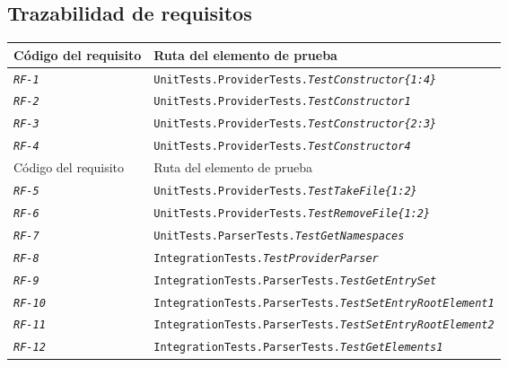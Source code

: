     \subsection{Trazabilidad de requisitos} \label{subsec:trazabilidad}
        \begin{longtable}{|| M{3cm} | M{12cm} ||} 
                \hline
                    Código del requisito & Ruta del elemento de prueba \\
                \hline\hline
                    \texttt{\textit{RF-1}} & \texttt{UnitTests.ProviderTests.\textit{TestConstructor\{1:4\}}} \\ 
                \hline
                    \texttt{\textit{RF-2}} & \texttt{UnitTests.ProviderTests.\textit{TestConstructor1}} \\
                \hline
                    \texttt{\textit{RF-3}} & \texttt{UnitTests.ProviderTests.\textit{TestConstructor\{2:3\}}} \\
                \hline
                    \texttt{\textit{RF-4}} & \texttt{UnitTests.ProviderTests.\textit{TestConstructor4}} \\
                \hline
                    Código del requisito & Ruta del elemento de prueba \\
                \hline
                \hline
                    \texttt{\textit{RF-5}} & \texttt{UnitTests.ProviderTests.\textit{TestTakeFile\{1:2\}}} \\
                \hline
                    \texttt{\textit{RF-6}} & \texttt{UnitTests.ProviderTests.\textit{TestRemoveFile\{1:2\}}} \\
                \hline
                    \texttt{\textit{RF-7}} & \texttt{UnitTests.ParserTests.\textit{TestGetNamespaces}} \\
                \hline
                    \texttt{\textit{RF-8}} & \texttt{IntegrationTests.\textit{TestProviderParser}} \\
                \hline
                    \texttt{\textit{RF-9}} & \texttt{IntegrationTests.ParserTests.\textit{TestGetEntrySet}} \\
                \hline
                    \texttt{\textit{RF-10}} & \texttt{IntegrationTests.ParserTests.\textit{TestSetEntryRootElement1}} \\
                \hline
                    \texttt{\textit{RF-11}} & \texttt{IntegrationTests.ParserTests.\textit{TestSetEntryRootElement2}} \\
                \hline
                    \texttt{\textit{RF-12}} & \texttt{IntegrationTests.ParserTests.\textit{TestGetElements1}} \\

\end{longtable}
